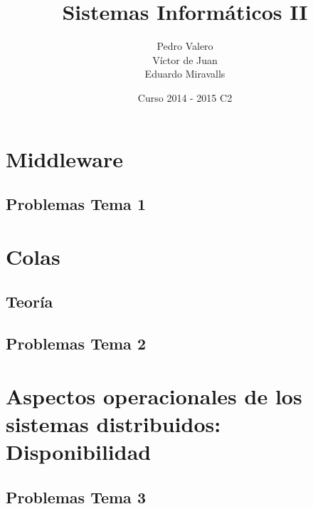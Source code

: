 \documentclass{apuntes}
\title{Sistemas Informáticos II}
\author{Pedro Valero \\ Víctor de Juan \\ Eduardo Miravalls}
\date{Curso 2014 - 2015 C2}
\begin{document}
\newpage
\tableofcontents


\chapter{Middleware}


\section{Problemas Tema 1}


\chapter{Colas}
\section{Teoría}
\section{Problemas Tema 2}



\chapter{Aspectos operacionales de los sistemas distribuidos: Disponibilidad}

\newpage
\section{Problemas Tema 3}


\printindex
\end{document}
